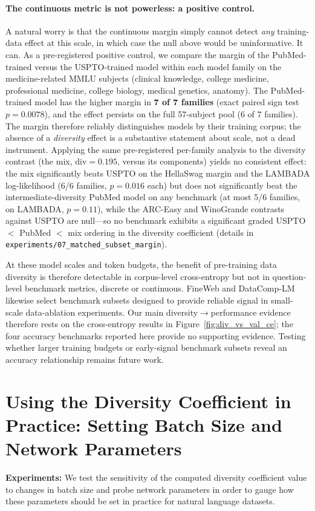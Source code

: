\paragraph{The continuous metric is not powerless: a positive control.}
A natural worry is that the continuous margin simply cannot detect \emph{any} training-data effect at this scale, in which case the null above would be uninformative.
It can. As a pre-registered positive control, we compare the margin of the PubMed-trained versus the USPTO-trained model within each model family on the medicine-related MMLU subjects (clinical knowledge, college medicine, professional medicine, college biology, medical genetics, anatomy).
The PubMed-trained model has the higher margin in \textbf{7 of 7 families} (exact paired sign test $p = 0.0078$), and the effect persists on the full 57-subject pool (6 of 7 families).
The margin therefore reliably distinguishes models by their training corpus; the absence of a \emph{diversity} effect is a substantive statement about scale, not a dead instrument.
Applying the same pre-registered per-family analysis to the diversity contrast (the mix, $\mathrm{div}=0.195$, versus its components) yields no consistent effect: the mix significantly beats USPTO on the HellaSwag margin and the LAMBADA log-likelihood (6/6 families, $p=0.016$ each) but does not significantly beat the intermediate-diversity PubMed model on any benchmark (at most 5/6 families, on LAMBADA, $p=0.11$), while the ARC-Easy and WinoGrande contrasts against USPTO are null---so no benchmark exhibits a significant graded USPTO $<$ PubMed $<$ mix ordering in the diversity coefficient (details in \texttt{experiments/07\_matched\_subset\_margin}).

At these model scales and token budgets, the benefit of pre-training data diversity is therefore detectable in corpus-level cross-entropy but not in question-level benchmark metrics, discrete or continuous.
FineWeb \citep{penedo2024fineweb} and DataComp-LM \citep{li2024datacomp} likewise select benchmark subsets designed to provide reliable signal in small-scale data-ablation experiments.
Our main diversity$\to$performance evidence therefore rests on the cross-entropy results in Figure~\ref{fig:div_vs_val_ce}; the four accuracy benchmarks reported here provide no supporting evidence.
Testing whether larger training budgets or early-signal benchmark subsets reveal an accuracy relationship remains future work.

\section{Using the Diversity Coefficient in Practice: Setting Batch Size and Network Parameters}
\label{body:div_parameters}
\textbf{Experiments:}
We test the sensitivity of the computed diversity coefficient value to changes in batch size and probe network parameters in order to gauge how these parameters should be set in practice for natural language datasets. 

